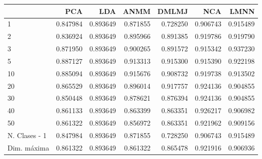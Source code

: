 \begin{tabular}{lrrrrrr}
\toprule
{} &       PCA &       LDA &      ANMM &     DMLMJ &       NCA &      LMNN \\
\midrule
1             &  0.847984 &  0.893649 &  0.871855 &  0.728250 &  0.906743 &  0.915489 \\
2             &  0.836924 &  0.893649 &  0.895966 &  0.891385 &  0.919786 &  0.919790 \\
3             &  0.871950 &  0.893649 &  0.900265 &  0.891572 &  0.915342 &  0.937230 \\
5             &  0.887127 &  0.893649 &  0.913313 &  0.915300 &  0.915390 &  0.922198 \\
10            &  0.885094 &  0.893649 &  0.915676 &  0.908732 &  0.919738 &  0.913502 \\
20            &  0.865529 &  0.893649 &  0.896014 &  0.917757 &  0.924136 &  0.904855 \\
30            &  0.850448 &  0.893649 &  0.878621 &  0.876394 &  0.924136 &  0.904855 \\
40            &  0.861133 &  0.893649 &  0.863399 &  0.863351 &  0.926217 &  0.906982 \\
50            &  0.861322 &  0.893649 &  0.856972 &  0.863351 &  0.921962 &  0.909156 \\
N. Clases - 1 &  0.847984 &  0.893649 &  0.871855 &  0.728250 &  0.906743 &  0.915489 \\
Dim. máxima   &  0.861322 &  0.893649 &  0.861322 &  0.865478 &  0.921916 &  0.906936 \\
\bottomrule
\end{tabular}
